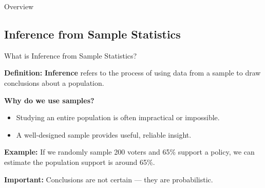 \documentclass{beamer}
\begin{document}
\begin{frame}{Overview}
    \tableofcontents
\end{frame}



\begin{frame}
\section{Inference from Sample Statistics}
\end{frame}


\begin{frame}{What is Inference from Sample Statistics?}
\small

\textbf{Definition:}  
\textbf{Inference} refers to the process of using data from a sample to draw conclusions about a population.

\vspace{0.3cm}
\textbf{Why do we use samples?}
\begin{itemize}
    \item Studying an entire population is often impractical or impossible.
    \item A well-designed sample provides useful, reliable insight.
\end{itemize}

\vspace{0.3cm}
\textbf{Example:}  
If we randomly sample 200 voters and 65\% support a policy, we can estimate the population support is around 65\%.

\textbf{Important:} Conclusions are not certain — they are probabilistic.

\end{frame}
\end{document}
